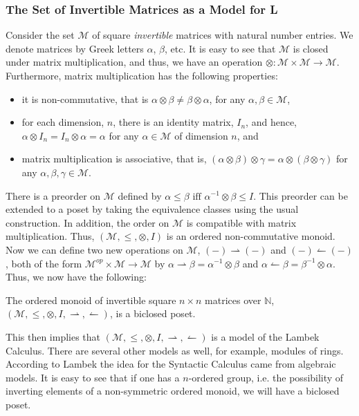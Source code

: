 \documentclass{llncs}
\let\mto\to                     %
\let\to\relax                   %
\newcommand{\to}{\rightarrow}
\newcommand{\rto}{\leftharpoonup}
\newcommand{\lto}{\rightharpoonup}
\begin{document}
\subsubsection{The Set of Invertible Matrices as a Model for L}
\label{subsec:the_set_of_invertible_matrices}

Consider the set $\mathcal{M}$ of square \textit{invertible} matrices with
natural number entries.  We denote matrices by Greek letters $\alpha$,
$\beta$, etc.  It is easy to see that $\mathcal{M}$ is closed under
matrix multiplication, and thus, we have an operation $\otimes :
\mathcal{M} \times \mathcal{M} \mto \mathcal{M}$.  Furthermore, matrix
multiplication has the following properties:
\begin{itemize}
\item it is non-commutative, that is $\alpha \otimes \beta
  \neq \beta \otimes \alpha$, for any $\alpha,\beta \in \mathcal{M}$,
\item for each dimension, $n$, there is an identity matrix, $I_n$, and hence,
  $\alpha \otimes I_n = I_n \otimes \alpha = \alpha$ for any $\alpha \in
  \mathcal{M}$ of dimension $n$, and
\item matrix multiplication is associative, that is, $(\alpha \otimes
  \beta) \otimes \gamma = \alpha \otimes (\beta \otimes \gamma)$ for any
  $\alpha,\beta,\gamma \in \mathcal{M}$.
\end{itemize}
There is a preorder on $\mathcal{M}$ defined by
$\alpha \leq \beta \text{ iff } \alpha^{-1} \otimes \beta \leq I$.
This preorder can be extended to a poset by taking the equivalence
classes using the usual construction. In addition, the order on
$\mathcal{M}$ is compatible with matrix multiplication.  Thus,
$(\mathcal{M}, \leq, \otimes, I)$ is an ordered non-commutative
monoid.  Now we can define two new operations on $\mathcal{M}$, $(-)
\lto (-)$ and $(-) \rto (-)$, both of the form $\mathcal{M}^{op}
\times \mathcal{M} \mto \mathcal{M}$ by $\alpha \lto \beta =
\alpha^{-1} \otimes \beta$ and $\alpha \rto \beta = \beta^{-1} \otimes
\alpha$.  Thus, we now have the following:
\begin{lemma}
  \label{lemma:M-is-biclosed-poset}
  The ordered monoid of invertible square $n \times n$ matrices over
  $\mathbb{N}$, $(\mathcal{M},\leq,\otimes,I,\lto,\rto)$, is a
  biclosed poset.
\end{lemma}
This then implies that $(\mathcal{M},\leq,\otimes,I,\lto,\rto)$ is a
model of the Lambek Calculus.  There are several other models as well,
for example, modules of rings.  According to Lambek the idea for the
Syntactic Calculus came from algebraic models.  It is easy to see that
if one has a $n$-ordered group, i.e. the possibility of inverting
elements of a non-symmetric ordered monoid, we will have a biclosed
poset.
\vspace{-10px}
\end{document}
